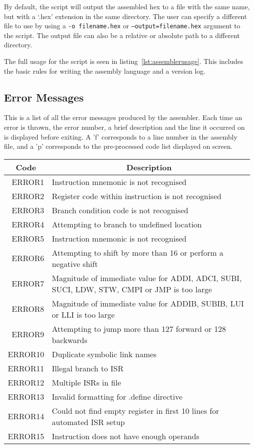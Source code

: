 By default, the script will output the assembled hex to a file with the same name, but with a `.hex' extension in the same directory.
The user can specify a different file to use by using a \texttt{-o filename.hex} or \texttt{--output=filename.hex} argument to the script.
The output file can also be a relative or absolute path to a different directory. 

The full usage for the script is seen in listing~\ref{lst:assemblerusage}. 
This includes the basic rules for writing the assembly language and a version log. 



\newpage
\subsection{Error Messages}
This is a list of all the error messages produced by the assembler. Each time an error is thrown, the error number, a brief description and the line it occurred on is displayed before exiting. A 'f' corresponds to a line number in the assembly file, and a 'p' corresponds to the pre-processed code list displayed on screen. 

\begin{center}
	\centering
	\begin{tabular}{r|p{12cm}}
		\multicolumn{1}{c}{\bf Code} & \multicolumn{1}{c}{\bf Description} \\
		\hline\hline
		ERROR1& Instruction mnemonic is not recognised \\
		ERROR2& Register code within instruction is not recognised\\
		ERROR3& Branch condition code is not recognised\\
		ERROR4& Attempting to branch to undefined location \\
		ERROR5& Instruction mnemonic is not recognised \\
		ERROR6& Attempting to shift by more than 16 or perform a negative shift \\
		ERROR7& Magnitude of immediate value for ADDI, ADCI, SUBI, SUCI, LDW, STW, CMPI or JMP is too large\\
		ERROR8& Magnitude of immediate value for ADDIB, SUBIB, LUI or LLI is too large \\
		ERROR9& Attempting to jump more than 127 forward or 128 backwards \\
		ERROR10& Duplicate symbolic link names \\
		ERROR11& Illegal branch to ISR \\
		ERROR12& Multiple ISRs in file \\
		ERROR13& Invalid formatting for .define directive \\
		ERROR14& Could not find empty register in first 10 lines for automated ISR setup \\
		ERROR15& Instruction does not have enough operands \\
	\end{tabular}
\end{center}
